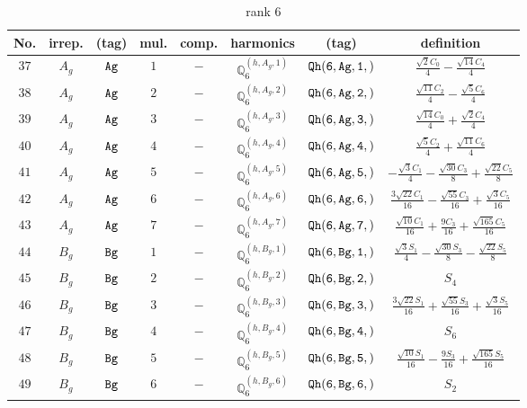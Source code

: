 \documentclass[fleqn,8pt]{jsarticle}
\begin{document}
\begin{table}[ht!]
\begin{center}
\caption{rank 6}
\renewcommand{\arraystretch}{1.3}
\begin{tabular}{cccccccc} \hline \hline
No. & irrep. & (tag) & mul. & comp. & harmonics & (tag) & definition \\ \hline
$ 37 $ & $ A_{g} $ & $ {\tt Ag} $ & $ 1 $ & $ - $ & $ \mathbb{Q}_{6}^{(h,A_{g},1)} $ & $ {\tt Qh(6,Ag,1,)} $ & $ \frac{\sqrt{2} C_{0}}{4} - \frac{\sqrt{14} C_{4}}{4} $ \\
$ 38 $ & $ A_{g} $ & $ {\tt Ag} $ & $ 2 $ & $ - $ & $ \mathbb{Q}_{6}^{(h,A_{g},2)} $ & $ {\tt Qh(6,Ag,2,)} $ & $ \frac{\sqrt{11} C_{2}}{4} - \frac{\sqrt{5} C_{6}}{4} $ \\
$ 39 $ & $ A_{g} $ & $ {\tt Ag} $ & $ 3 $ & $ - $ & $ \mathbb{Q}_{6}^{(h,A_{g},3)} $ & $ {\tt Qh(6,Ag,3,)} $ & $ \frac{\sqrt{14} C_{0}}{4} + \frac{\sqrt{2} C_{4}}{4} $ \\
$ 40 $ & $ A_{g} $ & $ {\tt Ag} $ & $ 4 $ & $ - $ & $ \mathbb{Q}_{6}^{(h,A_{g},4)} $ & $ {\tt Qh(6,Ag,4,)} $ & $ \frac{\sqrt{5} C_{2}}{4} + \frac{\sqrt{11} C_{6}}{4} $ \\
$ 41 $ & $ A_{g} $ & $ {\tt Ag} $ & $ 5 $ & $ - $ & $ \mathbb{Q}_{6}^{(h,A_{g},5)} $ & $ {\tt Qh(6,Ag,5,)} $ & $ - \frac{\sqrt{3} C_{1}}{4} - \frac{\sqrt{30} C_{3}}{8} + \frac{\sqrt{22} C_{5}}{8} $ \\
$ 42 $ & $ A_{g} $ & $ {\tt Ag} $ & $ 6 $ & $ - $ & $ \mathbb{Q}_{6}^{(h,A_{g},6)} $ & $ {\tt Qh(6,Ag,6,)} $ & $ \frac{3 \sqrt{22} C_{1}}{16} - \frac{\sqrt{55} C_{3}}{16} + \frac{\sqrt{3} C_{5}}{16} $ \\
$ 43 $ & $ A_{g} $ & $ {\tt Ag} $ & $ 7 $ & $ - $ & $ \mathbb{Q}_{6}^{(h,A_{g},7)} $ & $ {\tt Qh(6,Ag,7,)} $ & $ \frac{\sqrt{10} C_{1}}{16} + \frac{9 C_{3}}{16} + \frac{\sqrt{165} C_{5}}{16} $ \\
$ 44 $ & $ B_{g} $ & $ {\tt Bg} $ & $ 1 $ & $ - $ & $ \mathbb{Q}_{6}^{(h,B_{g},1)} $ & $ {\tt Qh(6,Bg,1,)} $ & $ \frac{\sqrt{3} S_{1}}{4} - \frac{\sqrt{30} S_{3}}{8} - \frac{\sqrt{22} S_{5}}{8} $ \\
$ 45 $ & $ B_{g} $ & $ {\tt Bg} $ & $ 2 $ & $ - $ & $ \mathbb{Q}_{6}^{(h,B_{g},2)} $ & $ {\tt Qh(6,Bg,2,)} $ & $ S_{4} $ \\
$ 46 $ & $ B_{g} $ & $ {\tt Bg} $ & $ 3 $ & $ - $ & $ \mathbb{Q}_{6}^{(h,B_{g},3)} $ & $ {\tt Qh(6,Bg,3,)} $ & $ \frac{3 \sqrt{22} S_{1}}{16} + \frac{\sqrt{55} S_{3}}{16} + \frac{\sqrt{3} S_{5}}{16} $ \\
$ 47 $ & $ B_{g} $ & $ {\tt Bg} $ & $ 4 $ & $ - $ & $ \mathbb{Q}_{6}^{(h,B_{g},4)} $ & $ {\tt Qh(6,Bg,4,)} $ & $ S_{6} $ \\
$ 48 $ & $ B_{g} $ & $ {\tt Bg} $ & $ 5 $ & $ - $ & $ \mathbb{Q}_{6}^{(h,B_{g},5)} $ & $ {\tt Qh(6,Bg,5,)} $ & $ \frac{\sqrt{10} S_{1}}{16} - \frac{9 S_{3}}{16} + \frac{\sqrt{165} S_{5}}{16} $ \\
$ 49 $ & $ B_{g} $ & $ {\tt Bg} $ & $ 6 $ & $ - $ & $ \mathbb{Q}_{6}^{(h,B_{g},6)} $ & $ {\tt Qh(6,Bg,6,)} $ & $ S_{2} $ \\
 \hline \hline
\end{tabular}
\end{center}
\end{table}
\end{document}
